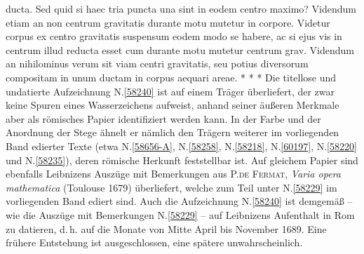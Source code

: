 ducta.
Sed quid
si haec tria puncta una sint
in eodem centro maximo?%
\pend%
\pstart%
Videndum etiam
an non centrum gravitatis%
durante motu
mutetur in corpore.
\pend%
\pstart%
Videtur corpus
ex centro gravitatis suspensum%
eodem modo se habere,
ac si ejus vis in centrum illud reducta esset%
cum durante motu mutetur centrum grav.%
\pend%
\pstart%
Videndum an nihilominus verum sit
viam centri gravitatis,%
seu potius diversorum compositam
in unum ductam%
\bracks{,}
in corpus aequari areae.
\pend%
\newpage%
\pstart%
\noindent%
\centering%
*     *     *
\pend%
\vspace{4.0em}%
%
\frenchspacing%
\footnotesize%
\pstart%
\noindent%
%
Die titellose und undatierte Aufzeichnung N.\;\ref{58240} ist auf einem Träger überliefert, der zwar keine Spuren eines Wasserzeichens aufweist, anhand seiner äußeren Merkmale aber als römisches Papier identifiziert werden kann.
In der Farbe und der Anordnung der Stege ähnelt er nämlich den Trägern weiterer im vorliegenden Band edierter Texte (etwa N.\;\ref{58656-A}, N.\;\ref{58258}, N.\;\ref{58218}, N.\;\ref{60197}, N.\;\ref{58220} und N.\;\ref{58235}), deren römische Herkunft feststellbar ist.
Auf gleichem Papier sind ebenfalls Leibnizens Auszüge mit Bemerkungen aus \textsc{P.\;de Fermat}, \textit{Varia opera mathematica} (Toulouse 1679)\cite{00533} überliefert, welche zum Teil unter N.\;\ref{58229} im vorliegenden Band ediert sind.
Auch die Aufzeichnung N.\;\ref{58240} ist demgemäß -- wie die Auszüge mit Bemerkungen N.\;\ref{58229} -- auf Leibnizens Aufenthalt in Rom zu datieren, d.\,h. auf die Monate von Mitte April bis November 1689.
Eine frühere Entstehung ist ausgeschlossen, eine spätere unwahrscheinlich.
\pend%
%
\frenchspacing%
\normalsize%
